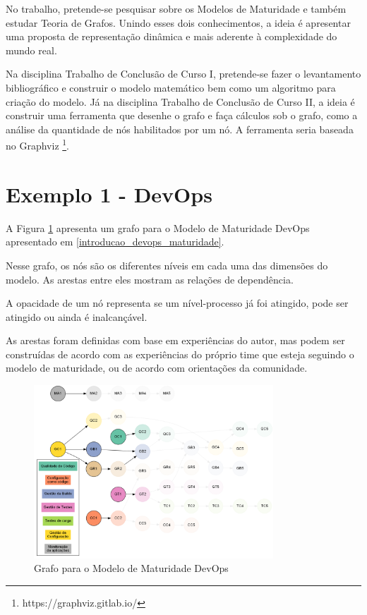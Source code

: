 \documentclass[10pt,a4paper]{article}
\begin{document}
	No trabalho, pretende-se pesquisar sobre os Modelos de Maturidade e também estudar Teoria de Grafos. Unindo esses dois conhecimentos, a ideia é apresentar uma proposta de representação dinâmica e mais aderente à complexidade do mundo real.
	
	Na disciplina Trabalho de Conclusão de Curso I, pretende-se fazer o levantamento bibliográfico e construir o modelo matemático bem como um algoritmo para criação do modelo. Já na disciplina Trabalho de Conclusão de Curso II, a ideia é construir uma ferramenta que desenhe o grafo e faça cálculos sob o grafo, como a análise da quantidade de nós habilitados por um nó. A ferramenta seria baseada no Graphviz \footnote{https://graphviz.gitlab.io/}.
	
	\section{Exemplo 1 - DevOps}
	
	A Figura \ref{fig:grafo_devops} apresenta um grafo para o Modelo de Maturidade DevOps apresentado em \ref{introducao_devops_maturidade}.
	
	Nesse grafo, os nós são os diferentes níveis em cada uma das dimensões do modelo. As arestas entre eles mostram as relações de dependência.
	
	A opacidade de um nó representa se um nível-processo já foi atingido, pode ser atingido ou ainda é inalcançável. 
	
	As arestas foram definidas com base em experiências do autor, mas podem ser construídas de acordo com as experiências do próprio time que esteja seguindo o modelo de maturidade, ou de acordo com orientações da comunidade.
	
	\begin{figure}
	    \centering
	    \includegraphics[width=0.8\textwidth]{grafo_devops.png}
	    \caption{Grafo para o Modelo de Maturidade DevOps}
	    \label{fig:grafo_devops}
	\end{figure}
	
\end{document}
